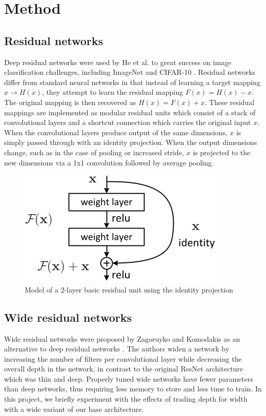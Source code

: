\documentclass[10pt,twocolumn,letterpaper]{article}
\begin{document}

\section{Method}
\subsection{Residual networks}
Deep residual networks were used by He et al. to great success on image classification challenges, including ImageNet and CIFAR-10 \cite{hekaming2016}. Residual networks differ from standard neural networks in that instead of learning a target mapping $x \rightarrow H(x)$, they attempt to learn the residual mapping $F(x) = H(x) - x$. The original mapping is then recovered as $H(x) = F(x) + x$. These residual mappings are implemented as modular residual units which consist of a stack of convolutional layers and a shortcut connection which carries the original input $x$. When the convolutional layers produce output of the same dimensions, $x$ is simply passed through with an identity projection. When the output dimensions change, such as in the case of pooling or increased stride, $x$ is projected to the new dimensions via a 1x1 convolution followed by average pooling.

 \begin{figure}[h]
	\begin{center}
	\includegraphics[width=.5\linewidth]{resnet}
	\caption{Model of a 2-layer basic residual unit using the identity projection \cite{hekaming2016} }
	\end{center}
\end{figure}

\subsection{Wide residual networks}
Wide residual networks were proposed by Zagoruyko and Komodakis as an alternative to deep residual networks \cite{zagoruyko2016wide}. The authors widen a network by increasing the number of filters per convolutional layer while decreasing the overall depth in the network, in contrast to the original ResNet architecture which was thin and deep. Properly tuned wide networks have fewer parameters than deep networks, thus requiring less memory to store and less time to train. In this project, we briefly experiment with the effects of trading depth for width with a wide variant of our base architecture.
\end{document}
